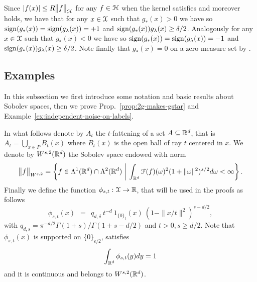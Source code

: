 Since $|f(x)| \leq R\bigl\|{f}\bigr\|_\mathcal H$ for any $f \in \mathcal H$ when the kernel satisfies  and moreover  holds, we have that for any $x \in {\mathcal X}$ such that $g_\ast(x) > 0$ we have
so $\mathop{ \mathrm{sign}}(g_\ast(x)) = \mathop{ \mathrm{sign}}(g_\lambda(x)) = +1$ and $\mathop{ \mathrm{sign}}(g_\ast(x))g_\lambda(x) \geq \delta/2$. Analogously for any $x \in {\mathcal X}$ such that $g_\ast(x) < 0$ we have
so $\mathop{ \mathrm{sign}}(g_\ast(x)) = \mathop{ \mathrm{sign}}(g_\lambda(x)) = -1$ and $\mathop{ \mathrm{sign}}(g_\ast(x))g_\lambda(x) \geq \delta/2$. Note finally that $g_\ast(x) = 0$ on a zero measure set by .
\epr

\subsection{Examples}\label{sect:A5-examples}

In this subsection we first introduce some notation and basic results about Sobolev spaces, then we prove Prop.~\ref{prop:2g-makes-gstar} and Example~\ref{ex:independent-noise-on-labels}.

In what follows denote by $A_{t}$ the $t$-fattening of a set $A \subseteq \mathbb R^d$, that is $A_t = \bigcup_{x \in P} B_t(x)$ where $B_t(x)$ is the open ball of ray $t$ centered in $x$. 
We denote by $W^{s,2}(\mathbb R^d)$ the Sobolev space endowed with norm 
$$\bigl\|{f}\bigr\|_{W^{s,2}} = \left\{f \in { \Lambda}^1(\mathbb R^d) \cap { \Lambda}^2(\mathbb R^d) ~\middle|~ \int_{\mathbb R^d} {\cal F}(f)(\omega)^2 (1 + \|\omega\|^2)^{s/2} d\omega < \infty \right\}.$$
Finally we define the function $\phi_{s,t}:{\mathcal X}\to\mathbb R$, that will be used in the proofs as follows
$$\phi_{s, t}(x) ~~=~~ q_{d,\delta} ~t^{-d} ~ 1_{\{0\}_t}(x) ~ (1 - \|x/t\|^2)^{s - d/2},$$
with $q_{d,s} = \pi^{-d/2}\Gamma(1+s)/\Gamma(1+s-d/2)$ and $t > 0, s \geq d/2$.
Note that $\phi_{s, t}(x)$ is supported on $\{0\}_{\epsilon/2}$, satisfies
$$ \int_{\mathbb R^d} \phi_{s, t}(y) dy = 1$$
and it is continuous and belongs to $W^{s,2}(\mathbb R^d)$. 


